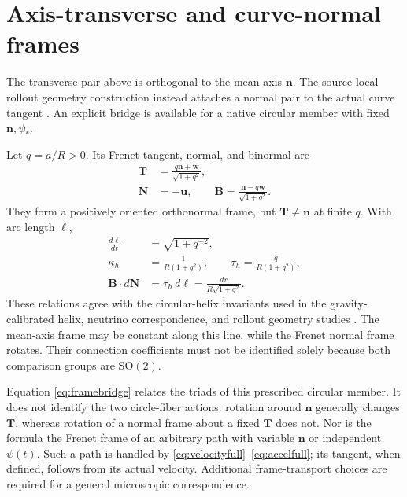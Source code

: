 \documentclass[11pt]{article}
\newcommand{\SO}{\mathrm{SO}}
\newcommand{\n}{\bm n}
\newcommand{\uu}{\bm u}
\newcommand{\ww}{\bm w}
\begin{document}
\section{Axis-transverse and curve-normal frames}

The transverse pair above is orthogonal to the mean axis $\n$. The source-local rollout geometry construction instead attaches a normal pair to the actual curve tangent \cite{WuGeometry}. An explicit bridge is available for a native circular member with fixed $\n,\psi_*$.

Let $q=a/R>0$. Its Frenet tangent, normal, and binormal are
\begin{equation}
 \begin{aligned}
 \bm T&=\frac{q\n+\ww}{\sqrt{1+q^2}},\\
 \bm N&=-\uu,\qquad
 \bm B=\frac{\n-q\ww}{\sqrt{1+q^2}}.
 \end{aligned}
 \label{eq:framebridge}
\end{equation}
They form a positively oriented orthonormal frame, but $\bm T\ne\n$ at finite $q$. With arc length $\ell$,
\begin{equation}
 \begin{aligned}
 \frac{d\ell}{dr}&=\sqrt{1+q^{-2}},\\
 \kappa_h&=\frac{1}{R(1+q^2)},\qquad
 \tau_h=\frac{q}{R(1+q^2)},\\
 \bm B\cdot d\bm N&=\tau_h\,d\ell
       =\frac{dr}{R\sqrt{1+q^2}}.
 \end{aligned}
 \label{eq:bridgeconnection}
\end{equation}
These relations agree with the circular-helix invariants used in the gravity-calibrated helix, neutrino correspondence, and rollout geometry studies \cite{WuHelix,WuNeutrino,WuGeometry}. The mean-axis frame may be constant along this line, while the Frenet normal frame rotates. Their connection coefficients must not be identified solely because both comparison groups are $\SO(2)$.

Equation \eqref{eq:framebridge} relates the triads of this prescribed circular member. It does not identify the two circle-fiber actions: rotation around $\n$ generally changes $\bm T$, whereas rotation of a normal frame about a fixed $\bm T$ does not. Nor is the formula the Frenet frame of an arbitrary path with variable $\n$ or independent $\psi(t)$. Such a path is handled by \eqref{eq:velocityfull}--\eqref{eq:accelfull}; its tangent, when defined, follows from its actual velocity. Additional frame-transport choices are required for a general microscopic correspondence.
\end{document}
